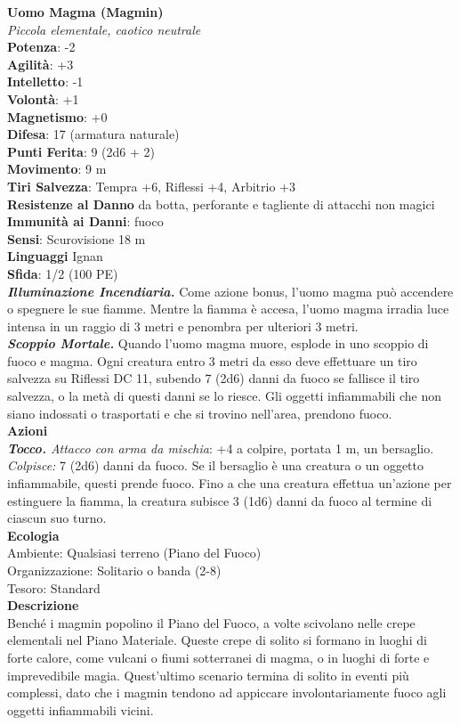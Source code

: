 \begin{multicols}{2}
\medskip\textbf{Uomo Magma (Magmin)}\\
\emph{Piccola elementale, caotico neutrale}\\
\textbf{Potenza}: -2\\
\textbf{Agilità}: +3\\
\textbf{Intelletto}: -1\\
\textbf{Volontà}: +1\\
\textbf{Magnetismo}: +0\\
\textbf{Difesa}: 17 (armatura naturale)\\
\textbf{Punti Ferita}: 9 (2d6 + 2)\\
\textbf{Movimento}: 9 m\\
\textbf{Tiri Salvezza}: Tempra +6, Riflessi +4, Arbitrio +3\\
\textbf{Resistenze al Danno} da botta, perforante e tagliente di attacchi non magici\\
\textbf{Immunità ai Danni}: fuoco\\
\textbf{Sensi}: Scurovisione 18 m\\
\textbf{Linguaggi} Ignan\\
\textbf{Sfida}: 1/2 (100 PE)\smallskip\\
\emph{\textbf{Illuminazione Incendiaria.}} Come azione bonus, l'uomo magma può accendere o spegnere le sue fiamme. Mentre la fiamma è accesa, l'uomo magma irradia luce intensa in un raggio di 3 metri e penombra per ulteriori 3 metri.\\
\emph{\textbf{Scoppio Mortale.}} Quando l'uomo magma muore, esplode in uno scoppio di fuoco e magma. Ogni creatura entro 3 metri da esso deve effettuare un tiro salvezza su Riflessi DC 11, subendo 7 (2d6) danni da fuoco se fallisce il tiro salvezza, o la metà di questi danni se lo riesce. Gli oggetti infiammabili che non siano indossati o trasportati e che si trovino nell'area, prendono fuoco.\\
\smallskip\textbf{Azioni}\\
\emph{\textbf{Tocco.} Attacco con arma da mischia}: +4 a colpire, portata 1 m, un bersaglio.\\
\emph{Colpisce:} 7 (2d6) danni da fuoco. Se il bersaglio è una creatura o un oggetto infiammabile, questi prende fuoco. Fino a che una creatura effettua un'azione per estinguere la fiamma, la creatura subisce 3 (1d6) danni da fuoco al termine di ciascun suo turno.\\
\textbf{Ecologia}\\
Ambiente: Qualsiasi terreno (Piano del Fuoco)\\
Organizzazione: Solitario o banda (2-8)\\
Tesoro: Standard\\
\textbf{Descrizione}\\
Benché i magmin popolino il Piano del Fuoco, a volte scivolano nelle crepe elementali nel Piano Materiale. Queste crepe di solito si formano in luoghi di forte calore, come vulcani o fiumi sotterranei di magma, o in luoghi di forte e imprevedibile magia. Quest'ultimo scenario termina di solito in eventi più complessi, dato che i magmin tendono ad appiccare involontariamente fuoco agli oggetti infiammabili vicini.\\


\end{multicols}
